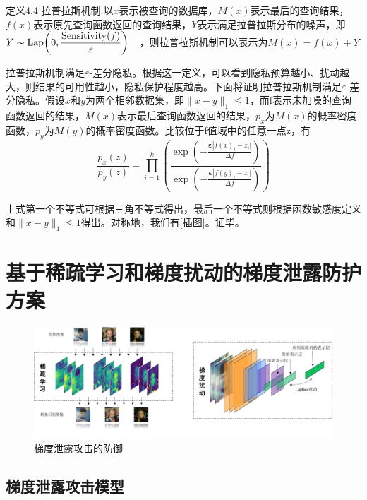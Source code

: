 定义4.4 拉普拉斯机制.以$x$表示被查询的数据库，$M(x)$表示最后的查询结果，$f(x)$表示原先查询函数返回的查询结果，$Y$表示满足拉普拉斯分布的噪声，即$\begin{aligned}Y&\thicksim\text{Lap}\bigg(0,\frac{\text{Sensitivity}(f)}{\varepsilon}\bigg)\end{aligned}$，则拉普拉斯机制可以表示为$M(x)=f(x)+Y$

拉普拉斯机制满足$\varepsilon $-差分隐私。根据这一定义，可以看到隐私预算越小、扰动越大，则结果的可用性越小，隐私保护程度越高。下面将证明拉普拉斯机制满足$\varepsilon $-差分隐私。假设$x$和$y$为两个相邻数据集，即$\parallel x - y \parallel_1 \le 1$，而f表示未加噪的查询函数返回的结果，$M(x)$表示最后查询函数返回的结果，$p_x$为$M(x)$的概率密度函数，$p_y$为$M(y)$的概率密度函数。比较位于f值域中的任意一点z，有
\begin{equation}
\frac{p_x(z)}{p_y(z)}=\prod_{i=1}^k\left(\frac{\exp\left(-\frac{\boldsymbol{\varepsilon}\left|f(x)_i-z_i\right. |}{\Delta f}\right)}{\exp\left(-\frac{\boldsymbol{\varepsilon}\left|f(y)_i-z_i\right. |}{\Delta f}\right)}\right)
\end{equation}

上式第一个不等式可根据三角不等式得出，最后一个不等式则根据函数敏感度定义和$\parallel x - y \parallel_1 \le 1$得出。对称地，我们有[插图]。证毕。

\section{基于稀疏学习和梯度扰动的梯度泄露防护方案}

\begin{figure}[htb]
\centering
    \includegraphics[scale=0.4]{figures/chapter4/chapter4.png}
    \caption{梯度泄露攻击的防御}
    \label{fig:Cluster the cars in the region}
\end{figure}

\subsection{梯度泄露攻击模型}

